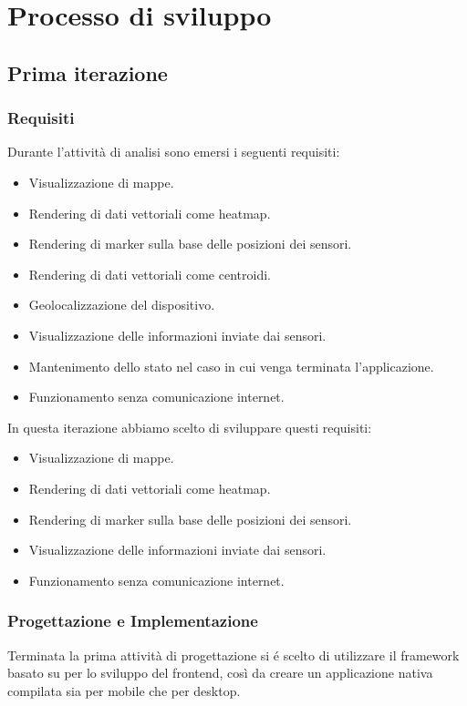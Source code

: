 \documentclass[a4paper]{report}
\begin{document}
\section*{{Processo di sviluppo}}

\subsection*{{Prima iterazione}}

\subsubsection*{{Requisiti}}

Durante l'attività di analisi sono emersi i seguenti requisiti:
\begin{itemize}
    \item Visualizzazione di mappe.
    \item Rendering di dati vettoriali come heatmap.
    \item Rendering di marker sulla base delle posizioni dei sensori.
    \item Rendering di dati vettoriali come centroidi.
    \item Geolocalizzazione del dispositivo.
    \item Visualizzazione delle informazioni inviate dai sensori.
    \item Mantenimento dello stato nel caso in cui venga terminata l'applicazione.
    \item Funzionamento senza comunicazione internet.
    \end{itemize} 
In questa iterazione abbiamo scelto di sviluppare questi requisiti:
\begin{itemize}
    \item Visualizzazione di mappe.
    \item Rendering di dati vettoriali come heatmap.
    \item Rendering di marker sulla base delle posizioni dei sensori.
    \item Visualizzazione delle informazioni inviate dai sensori.
    \item Funzionamento senza comunicazione internet.
    \end{itemize} 

\subsubsection*{{Progettazione e Implementazione}}
Terminata la prima attività di progettazione si é scelto di utilizzare il framework \cite{Flutter} basato su \cite{Dart} per lo sviluppo del frontend, così da creare un applicazione nativa compilata sia per mobile che per desktop. 
\end{document}
